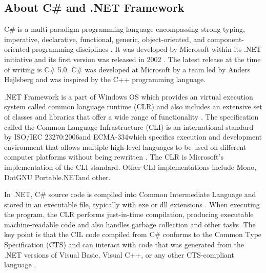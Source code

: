 \subsection{About C\# and .NET Framework}
C\# is a multi-paradigm programming language encompassing strong typing, imperative, declarative, functional, generic, object-oriented, and component-oriented programming disciplines \cite{cs1.0specs}. It was developed by Microsoft within its .NET initiative and its first version was released in 2002 \cite{cs1.0specs}. The latest release at the time of writing is C\# 5.0.
C\# was developed at Microsoft by a team led by Anders Hejlsberg and was inspired by the C++ programming language.

.NET Framework is a part of Windows OS which provides an virtual execution system called common language runtime (CLR) and also includes an extensive set of classes and libraries that offer a wide range of functionality \cite{csAndDotNet}. The specification called the Common Language Infrastructure (CLI) is an international standard by ISO/IEC 23270:2006\footnotemark[1] and ECMA-334\footnotemark[2] which specifies execution and development environment that allows multiple high-level languages to be used on different computer platforms without being rewritten \cite{csAndDotNet}. The CLR is Microsoft's implementation of the CLI standard. Other CLI implementations include Mono\footnotemark[3], DotGNU Portable.NET\footnotemark[4] and other.

In .NET, C\# source code is compiled into Common Intermediate Language and stored in an executable file, typically with exe or dll extensions \cite{csAndDotNet}. When executing the program, the CLR performs just-in-time compilation, producing executable machine-readable code and also handles garbage collection and other tasks. The key point is that the CIL code compiled from C\# conforms to the Common Type Specification (CTS) and can interact with code that was generated from the .NET versions of Visual Basic, Visual C++, or any other CTS-compliant language \cite{csAndDotNet}.





